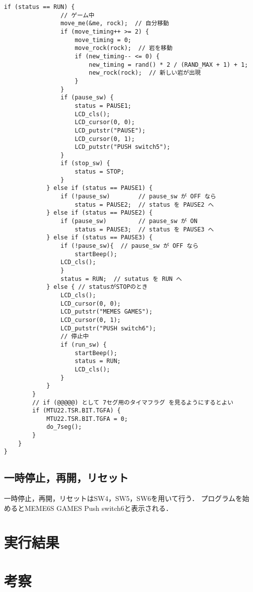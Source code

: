\documentclass[a4paper,11pt,dvipdfmx]{jsarticle}
\begin{document}
\begin{lstlisting}[caption=main.c, label=lst:main]
            if (status == RUN) {
                // ゲーム中
                move_me(&me, rock);  // 自分移動
                if (move_timing++ >= 2) {
                    move_timing = 0;
                    move_rock(rock);  // 岩を移動
                    if (new_timing-- <= 0) {
                        new_timing = rand() * 2 / (RAND_MAX + 1) + 1;
                        new_rock(rock);  // 新しい岩が出現
                    }
                }
                if (pause_sw) {
                    status = PAUSE1;
                    LCD_cls();
                    LCD_cursor(0, 0);
                    LCD_putstr("PAUSE");
                    LCD_cursor(0, 1);
                    LCD_putstr("PUSH switch5");
                }
                if (stop_sw) {
                    status = STOP;
                }
            } else if (status == PAUSE1) {
                if (!pause_sw)        // pause_sw が OFF なら
                    status = PAUSE2;  // status を PAUSE2 へ
            } else if (status == PAUSE2) {
                if (pause_sw)         // pause_sw が ON
                    status = PAUSE3;  // status を PAUSE3 へ
            } else if (status == PAUSE3) {
                if (!pause_sw){  // pause_sw が OFF なら
                    startBeep();
                LCD_cls();
				}
                status = RUN;  // sutatus を RUN へ
            } else { // statusがSTOPのとき
                LCD_cls();
                LCD_cursor(0, 0);
                LCD_putstr("MEMES GAMES");
                LCD_cursor(0, 1);
                LCD_putstr("PUSH switch6");
                // 停止中
                if (run_sw) {
                    startBeep();
                    status = RUN;
                    LCD_cls();
                }
            }
        }
        // if (@@@@@) として 7セグ用のタイマフラグ を見るようにするとよい
        if (MTU22.TSR.BIT.TGFA) {
            MTU22.TSR.BIT.TGFA = 0;
            do_7seg();
        }
    }
}
\end{lstlisting}

\subsection{一時停止，再開，リセット}
一時停止，再開，リセットはSW4，SW5，SW6を用いて行う．
プログラムを始めるとMEME6S GAMES Push switch6と表示される．

\section{実行結果}

\section{考察}
\end{document}

